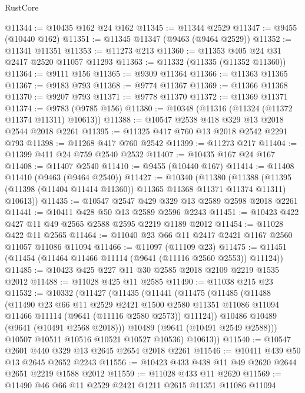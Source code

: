 \begin{lexlean}{RustCore}
\begin{coremodule}
@11344 := @10435 @162 @24 @162
@11345 := @11344 @2529
@11347 := @9455 (@10440 @162)
@11351 := @11345 @11347 (@9463 (@9464 @2529))
@11352 := @11341 @11351
@11353 := @11273 @213
@11360 := @11353 @405 @24 @31 @2417 @2520 @11057 @11293
@11363 := @11332 (@11335 (@11352 @11360))
@11364 := @9111 @156
@11365 := @9309 @11364
@11366 := @11363 @11365
@11367 := @9183 @793
@11368 := @9774 @11367
@11369 := @11366 @11368
@11370 := @9207 @793
@11371 := @9778 @11370
@11372 := @11369 @11371
@11374 := @9783 (@9785 @156)
@11380 := @10348 (@11316 (@11324 (@11372 @11374 @11311) @10613))
@11388 := @10547 @2538 @418 @329 @13 @2018 @2544 @2018 @2261
@11395 := @11325 @417 @760 @13 @2018 @2542 @2291 @793
@11398 := @11268 @417 @760 @2542
@11399 := @11273 @217
@11404 := @11399 @411 @24 @759 @2540 @2532
@11407 := @10435 @167 @24 @167
@11408 := @11407 @2540
@11410 := @9455 (@10440 @167)
@11414 := @11408 @11410 (@9463 (@9464 @2540))
@11427 := @10340
    (@11380
      (@11388 (@11395 (@11398 (@11404 @11414 @11360)) @11365 @11368 @11371 @11374 @11311) @10613))
@11435 := @10547 @2547 @429 @329 @13 @2589 @2598 @2018 @2261
@11441 := @10411 @428 @50 @13 @2589 @2596 @2243
@11451 := @10423 @422 @427 @11 @49 @2565 @2588 @2595 @2219 @1189 @2012
@11454 := @11028 @422 @11 @2565
@11464 := @11040 @23 @66 @11 @2417 @2421 @1167 @2560 @11057 @11086 @11094
@11466 := @11097 (@11109 @23)
@11475 := @11451 (@11454 (@11464 @11466 @11114 (@9641 (@11116 @2560 @2553)) @11124))
@11485 := @10423 @425 @227 @11 @30 @2585 @2018 @2109 @2219 @1535 @2012
@11488 := @11028 @425 @11 @2585
@11490 := @11038 @215 @23
@11532 := @10332
    (@11427
      (@11435
        (@11441
          (@11475
            (@11485
              (@11488
                (@11490
                  @23
                  @66
                  @11
                  @2529
                  @2421
                  @1500
                  @2580
                  @11351
                  @11086
                  @11094
                  @11466
                  @11114
                  (@9641 (@11116 @2580 @2573))
                  @11124))
              @10486
              @10489
              (@9641 (@10491 @2568 @2018)))
            @10489
            (@9641 (@10491 @2549 @2588)))
          @10507
          @10511
          @10516
          @10521
          @10527
          @10536)
        @10613))
@11540 := @10547 @2601 @440 @329 @13 @2645 @2654 @2018 @2261
@11546 := @10411 @439 @50 @13 @2645 @2652 @2243
@11556 := @10423 @433 @438 @11 @49 @2620 @2644 @2651 @2219 @1588 @2012
@11559 := @11028 @433 @11 @2620
@11569 := @11490 @46 @66 @11 @2529 @2421 @1211 @2615 @11351 @11086 @11094

\end{coremodule}
\end{lexlean}
